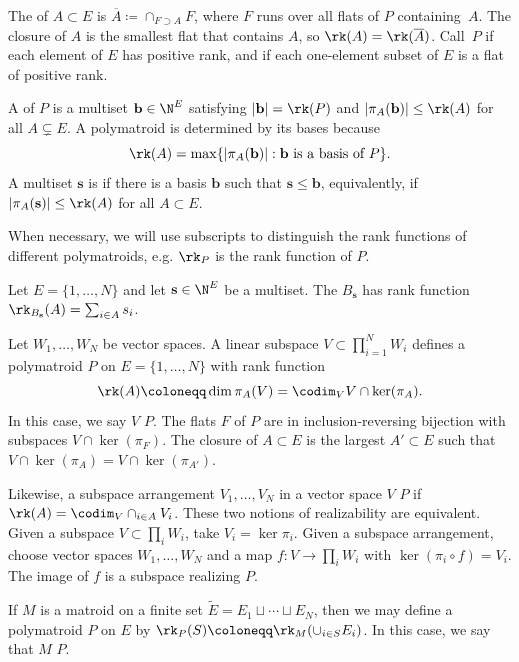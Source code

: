 The  of $A \subset E$ is $\overline A \coloneqq  \cap_{F \supset A} F$, where $F$ runs over all flats of $P$ containing~$A$.
The closure of $A$ is the smallest flat that contains $A$, so $\rk(A) = \rk(\overline A)$.
Call~$P$  if each element of $E$ has positive rank, and  if each one-element subset of $E$ is a flat of positive rank.

A  of $P$ is a multiset $\mathbf b \in \N^E$ satisfying $|\mathbf b| = \rk(P)$ and $|\pi_A(\mathbf b)| \leq \rk(A)$ for all $A \subsetneq E$.
A polymatroid is determined by its bases because 
\[
\rk(A) = \max \{ |\pi_A(\mathbf b)| : \mathbf b \text{ is a basis of $P$}\}.
\]
A multiset $\mathbf s$ is  if there is a basis $\mathbf b$ such that $\mathbf s \leq \mathbf b$, equivalently, if $|\pi_A(\mathbf s)| \leq \rk(A)$ for all $A \subset E$.

When necessary, we will use subscripts to distinguish the rank functions of different polymatroids, e.g.  $\rk_P$  is the rank function of $P$.
\begin{exam}\label{zb:free}
  Let $E = \{1, \ldots, N\}$ and let $\mathbf s \in \N^E$ be a multiset.
  The  $B_{\mathbf s}$ has rank function
    $\rk_{B_{\mathbf s}}(A) = \sum_{i \in A} s_i$.
\end{exam}
\begin{exam}\label{zb:geo}
  Let $W_1, \ldots, W_N$ be vector spaces.
  A linear subspace $V \subset \prod_{i=1}^N W_i$ defines a polymatroid $P$ on $E = \{1, \ldots, N\}$ with rank function
  \[ \rk(A) \coloneqq  \dim \pi_A(V) = \codim_V V \cap \ker(\pi_A). \]
  In this case, we say $V$  $P$.
  The flats $F$ of $P$ are in inclusion-reversing bijection with subspaces $V \cap \ker(\pi_F)$.
  The closure of  $A \subset E$ is the largest  $A' \subset E$ such that $V \cap\ker(\pi_A) = V \cap \ker(\pi_{A'})$.

  Likewise, a subspace arrangement $V_1, \ldots, V_N$ in a vector space $V$  $P$ if $\rk(A) = \codim_V \cap_{i \in A} V_i$.
  These two notions of realizability are equivalent. Given a subspace $V \subset \prod_i W_i$, take $V_i = \ker \pi_i$. Given a subspace arrangement, choose vector spaces $W_1, \ldots, W_N$ and a map $f: V \to \prod_i W_i$ with $\ker(\pi_i \circ f) = V_i$.
  The image of $f$ is a subspace realizing $P$.
\end{exam}
\begin{exam}[Lifts]\label{zb:partition}
  If $M$ is a matroid on a finite set $\widetilde E = E_1 \sqcup \cdots \sqcup E_N$, then we may define a polymatroid $P$ on $E$ by
  $\rk_P(S) \coloneqq  \rk_M(\cup_{i \in S} E_i)$. In this case, we say that $M$  $P$.
\end{exam}


